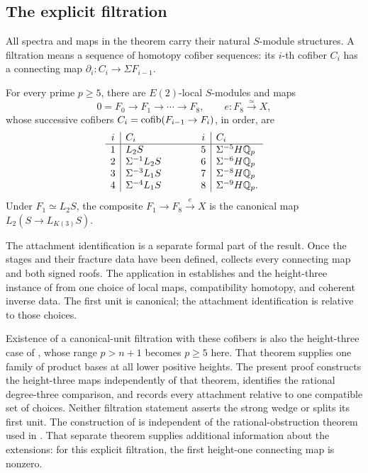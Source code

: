 \subsection{The explicit filtration}

All spectra and maps in the theorem carry their natural \(S\)-module
structures.  A filtration means a sequence of homotopy cofiber
sequences: its \(i\)-th cofiber \(C_i\) has a connecting map
\(\partial_i:C_i\to\Sigma F_{i-1}\).

\begin{theorem}\label{thm:main}
For every prime \(p\geq5\), there are \(E(2)\)-local \(S\)-modules
and maps
\[
 0=F_0\longrightarrow F_1\longrightarrow\cdots\longrightarrow F_8,
 \qquad e:F_8\xrightarrow{\simeq}X,
\]
whose successive cofibers \(C_i=\operatorname{cofib}(F_{i-1}\to F_i)\), in order,
are
\[
\begin{array}{c|l@{\qquad\qquad}c|l}
i&C_i&i&C_i\\ \hline
1&L_2S&5&\Sigma^{-5}H\Qp\\
2&\Sigma^{-1}L_2S&6&\Sigma^{-6}H\Qp\\
3&\Sigma^{-3}L_1S&7&\Sigma^{-8}H\Qp\\
4&\Sigma^{-4}L_1S&8&\Sigma^{-9}H\Qp.
\end{array}
\]
Under \(F_1\simeq L_2S\), the composite
\(F_1\to F_8\xrightarrow e X\) is the canonical map
\(L_2(S\to L_{K(3)}S)\).
\end{theorem}

The attachment identification is a separate formal part of the
result.  Once the stages and their fracture data have been defined,
 collects every connecting map
and both signed roofs.  The application in 
establishes  and the height-three instance of
 from one choice of local maps,
compatibility homotopy, and coherent inverse data.  The first unit is
canonical; the attachment identification is relative to those choices.

Existence of a canonical-unit filtration with these cofibers is also
the height-three case of
\cite[Theorem~1.1]{CompanionFilteredChromaticSplitting}, whose range
\(p>n+1\) becomes \(p\geq5\) here.  That theorem supplies one family
of product bases at all lower positive heights.  The present proof
constructs the height-three maps independently of that theorem,
identifies the rational degree-three comparison, and records every
attachment relative to one compatible set of choices.  Neither
filtration statement asserts the strong wedge or splits its first unit.
The construction of  is independent of the
rational-obstruction theorem used in .  That
separate theorem supplies additional information about the
extensions: for this explicit filtration, the first height-one
connecting map is nonzero.

